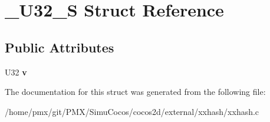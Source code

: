 \hypertarget{struct__U32__S}{}\section{\+\_\+\+U32\+\_\+S Struct Reference}
\label{struct__U32__S}
\subsection*{Public Attributes}
\begin{DoxyCompactItemize}
\item 
\mbox{\label{struct__U32__S_a9e62321efa6315b0fb8b252add8029b4}} 
U32 {\bfseries v}
\end{DoxyCompactItemize}


The documentation for this struct was generated from the following file\+:\begin{DoxyCompactItemize}
\item 
/home/pmx/git/\+P\+M\+X/\+Simu\+Cocos/cocos2d/external/xxhash/xxhash.\+c\end{DoxyCompactItemize}
